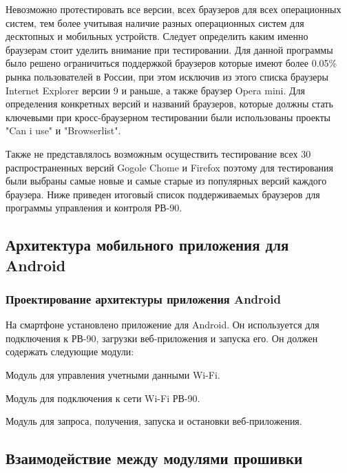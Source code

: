 Невозможно протестировать все версии, всех браузеров для всех операционных систем, тем более учитывая наличие разных операционных систем для десктопных и мобильных устройств. 
Следует определить каким именно браузерам стоит уделить внимание при тестировании. 
Для данной программы было решено ограничиться поддержкой браузеров которые имеют более 0.05\% рынка пользователей в России, при этом исключив из этого списка браузеры Internet Explorer версии 9 и раньше, а также браузер Opera mini. Для определения конкретных версий и названий браузеров, которые должны стать ключевыми при кросс-браузерном тестировании были использованы проекты "Can i use" и "Browserlist".

Также не представлялось возможным осуществить тестирование всех 30 распространенных версий Gogole Chome и Firefox поэтому для тестирования были выбраны самые новые и самые старые из популярных версий каждого браузера.
Ниже приведен итоговый список поддерживаемых браузеров для программы управления и контроля РВ-90.



\newpage
\subsection{Архитектура мобильного приложения для Android}

\subsubsection{Проектирование архитектуры приложения Android}
На смартфоне установлено приложение для Android. Он используется для подключения к РВ-90, загрузки веб-приложения и запуска его. Он должен содержать следующие модули:

\begin{my_itemize}
\item Модуль для управления учетными данными Wi-Fi.
\item Модуль для подключения к сети Wi-Fi РВ-90.
\item Модуль для запроса, получения, запуска и остановки веб-приложения.
\end{my_itemize}








\newpage
\subsection{Взаимодействие между модулями прошивки}



